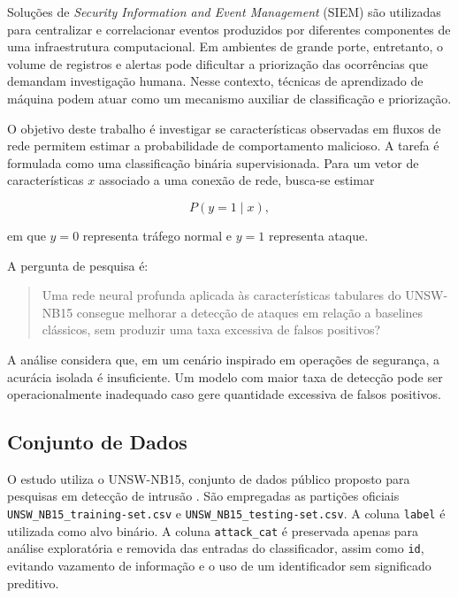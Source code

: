 \documentclass[12pt]{article}
\begin{document}
Soluções de \textit{Security Information and Event Management} (SIEM) são utilizadas para centralizar e correlacionar eventos produzidos por diferentes componentes de uma infraestrutura computacional. Em ambientes de grande porte, entretanto, o volume de registros e alertas pode dificultar a priorização das ocorrências que demandam investigação humana. Nesse contexto, técnicas de aprendizado de máquina podem atuar como um mecanismo auxiliar de classificação e priorização.

O objetivo deste trabalho é investigar se características observadas em fluxos de rede permitem estimar a probabilidade de comportamento malicioso. A tarefa é formulada como uma classificação binária supervisionada. Para um vetor de características $x$ associado a uma conexão de rede, busca-se estimar

\begin{equation}
    P(y=1\mid x),
\end{equation}

em que $y=0$ representa tráfego normal e $y=1$ representa ataque.

A pergunta de pesquisa é:

\begin{quote}
Uma rede neural profunda aplicada às características tabulares do UNSW-NB15 consegue melhorar a detecção de ataques em relação a baselines clássicos, sem produzir uma taxa excessiva de falsos positivos?
\end{quote}

A análise considera que, em um cenário inspirado em operações de segurança, a acurácia isolada é insuficiente. Um modelo com maior taxa de detecção pode ser operacionalmente inadequado caso gere quantidade excessiva de falsos positivos.

\subsection{Conjunto de Dados}

O estudo utiliza o UNSW-NB15, conjunto de dados público proposto para pesquisas em detecção de intrusão \cite{moustafa2015unsw,moustafa2016evaluation}. São empregadas as partições oficiais \texttt{UNSW\_NB15\_training-set.csv} e \texttt{UNSW\_NB15\_testing-set.csv}. A coluna \texttt{label} é utilizada como alvo binário. A coluna \texttt{attack\_cat} é preservada apenas para análise exploratória e removida das entradas do classificador, assim como \texttt{id}, evitando vazamento de informação e o uso de um identificador sem significado preditivo.
\end{document}
